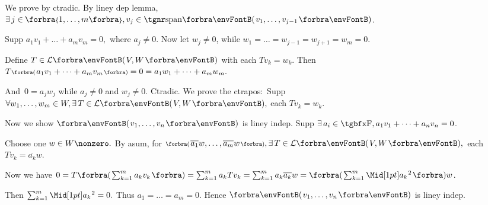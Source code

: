 \par\quad
We prove by ctradic. By liney dep lemma, $\exists\,j\in\;\!\!\Bra{1,\dots,m},v_j\in\Span{v_1,\dots,v_{j-1}}$.\par\quad
Supp $a_1 v_1+\dots+a_m v_m=0,$ where $a_j\neq 0.$ \;Now let $w_j\neq 0$, while $w_1=\dots=w_{j-1}=w_{j+1}=w_m=0.$\par\quad
Define $T\in\Lm{V,W}$ with each $Tv_k=w_k$. Then $T\BigPar{a_1 v_1+\dots+a_m v_m}=0=a_1 w_1+\dots+a_m w_m.$\par\quad
And \,$0=a_j w_j$ while $a_j\neq 0$ and $w_j\neq 0.$ Ctradic.\PfEnd\vspace{4pt}\quad
\Or We prove the ctrapos\hspace{1pt}: \,Supp $\forall w_1,\dots,w_m\in W,\exists\,T\in\Lm{V,W},$ each $Tv_k=w_k.$\par\quad
{Now we show $\Par{v_1,\dots,v_n}$ is liney indep. Supp {$\exists\,a_i\in\Fbb,a_1 v_1+\dots+a_n v_n=0$}.}\vspace{2pt}\par\quad
{Choose one $w\in W\nonzero.$ By asum, for {$\BigPar{\overline{a_1}w,\dots,\overline{a_m}w},\exists\,T\in\Lm{V,W},$ each $Tv_k=\overline{a_k}w.$}}\vspace{2pt}\par\quad
{Now we have {$ 0=T\BigBigPar{{\sum_{k=1}^m a_k v_k}}=\sum_{k=1}^m a_k Tv_k=\sum_{k=1}^m a_k\overline{a_k}w=\BigBigPar{{\sum_{k=1}^m \aMidsq{a_k}}}w$}.}\vspace{2pt}\par\quad
{Then {$\sum_{k=1}^m\aMidsq{a_k}=0.$ Thus $a_1=\dots=a_m=0.$} Hence $\Par{v_1,\dots,v_n}$ is liney indep.}\PfEnd
\SepLine

